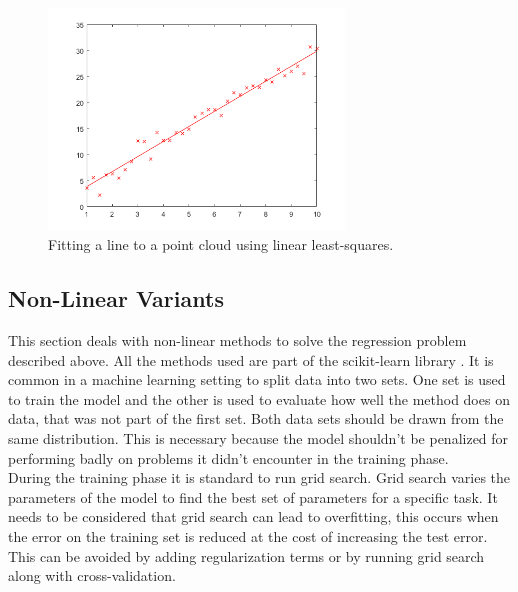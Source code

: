 \begin{figure}[h]
\centering
\includegraphics[width=0.7\textwidth]{figures/linReg}
\caption{Fitting a line to a point cloud using linear least-squares.}
\label{fig:linReg}
\end{figure}

\subsection{Non-Linear Variants}
\label{sec:nonLin}
This section deals with non-linear methods to solve the regression problem described above. All the methods used are part of the scikit-learn library \cite{scikit-learn}. It is common in a machine learning setting to split data into two sets. One set is used to train the model and the other is used to evaluate how well the method does on data, that was not part of the first set. Both data sets should be drawn from the same distribution. This is necessary because the model shouldn't be penalized for performing badly on problems it didn't encounter in the training phase.\\
During the training phase it is standard to run grid search. Grid search varies the parameters of the model to find the best set of parameters for a specific task. It needs to be considered that grid search can lead to overfitting, this occurs when the error on the training set is reduced at the cost of increasing the test error. This can be avoided by adding regularization terms or by running grid search along with cross-validation.
